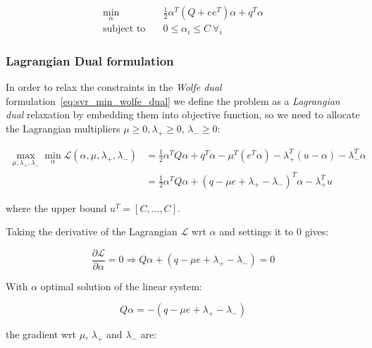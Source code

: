 \begin{equation} \label{eq:svr_min_bcqp_wolf_dual}
    \begin{aligned}
        \min_{\alpha} \quad & \frac{1}{2} \alpha^T (Q + ee^T)\alpha+q^T\alpha \\
            \text{subject to} \quad & 0\leq\alpha_i\leq C \ \forall_i
    \end{aligned}
\end{equation}

\subsubsection{Lagrangian Dual formulation}

In order to relax the constraints in the \emph{Wolfe dual} formulation~\eqref{eq:svr_min_wolfe_dual} we define the problem as a \emph{Lagrangian dual} relaxation by embedding them into objective function, so we need to allocate the Lagrangian multipliers $\mu \geq 0, \lambda_+ \geq 0$, $\lambda_- \geq 0$:

\begin{equation} \label{eq:svr_lagrangian_dual}
	\begin{aligned}
		    \max_{\mu,\lambda_+,\lambda_-} \min_{\alpha} \mathcal{L}(\alpha,\mu,\lambda_+,\lambda_-) &= \frac{1}{2} \alpha^T Q\alpha+q^T\alpha - \mu^T (e^T \alpha) - \lambda_+^T (u - \alpha) - \lambda_-^T \alpha \\
    &= \frac{1}{2} \alpha^T Q\alpha + (q - \mu e + \lambda_+ - \lambda_-)^T \alpha - \lambda_+^T u
	\end{aligned}
\end{equation}

where the upper bound $u^T = [C, \dots, C]$.

Taking the derivative of the Lagrangian $\mathcal{L}$ wrt $\alpha$ and settings it to 0 gives:

\begin{equation} \label{eq:svr_lagrangian_der_a}
	\frac{\partial \mathcal{L}}{\partial \alpha}=0\Rightarrow Q \alpha + (q - \mu e + \lambda_+ - \lambda_-) = 0
\end{equation}

With $\alpha$ optimal solution of the linear system:

\begin{equation} \label{eq:svr_lagrangian_sol}
    Q \alpha = - (q - \mu e + \lambda_+ - \lambda_-)
\end{equation}

the gradient wrt $\mu$, $\lambda_+$ and $\lambda_-$ are:

